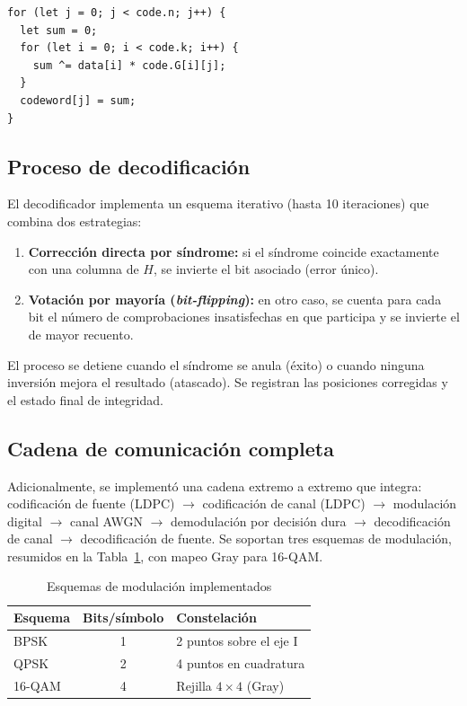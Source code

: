 \documentclass[conference]{IEEEtran}
\begin{document}
\begin{lstlisting}[caption={Núcleo del codificador en GF(2).},label={lst:enc}]
for (let j = 0; j < code.n; j++) {
  let sum = 0;
  for (let i = 0; i < code.k; i++) {
    sum ^= data[i] * code.G[i][j];
  }
  codeword[j] = sum;
}
\end{lstlisting}

\subsection{Proceso de decodificación}
El decodificador implementa un esquema iterativo (hasta 10 iteraciones) que combina dos estrategias:
\begin{enumerate}
  \item \textbf{Corrección directa por síndrome:} si el síndrome coincide exactamente con una columna de $H$, se invierte el bit asociado (error único).
  \item \textbf{Votación por mayoría (\emph{bit-flipping}):} en otro caso, se cuenta para cada bit el número de comprobaciones insatisfechas en que participa y se invierte el de mayor recuento.
\end{enumerate}
El proceso se detiene cuando el síndrome se anula (éxito) o cuando ninguna inversión mejora el resultado (atascado). Se registran las posiciones corregidas y el estado final de integridad.

\subsection{Cadena de comunicación completa}
Adicionalmente, se implementó una cadena extremo a extremo que integra: codificación de fuente (LDPC) $\rightarrow$ codificación de canal (LDPC) $\rightarrow$ modulación digital $\rightarrow$ canal AWGN $\rightarrow$ demodulación por decisión dura $\rightarrow$ decodificación de canal $\rightarrow$ decodificación de fuente. Se soportan tres esquemas de modulación, resumidos en la Tabla~\ref{tab:mod}, con mapeo Gray para 16-QAM.

\begin{table}[!t]
\caption{Esquemas de modulación implementados}
\label{tab:mod}
\centering
\begin{tabular}{lcl}
\toprule
\textbf{Esquema} & \textbf{Bits/símbolo} & \textbf{Constelación} \\
\midrule
BPSK   & 1 & 2 puntos sobre el eje I \\
QPSK   & 2 & 4 puntos en cuadratura \\
16-QAM & 4 & Rejilla $4\times4$ (Gray) \\
\bottomrule
\end{tabular}
\end{table}
\end{document}
